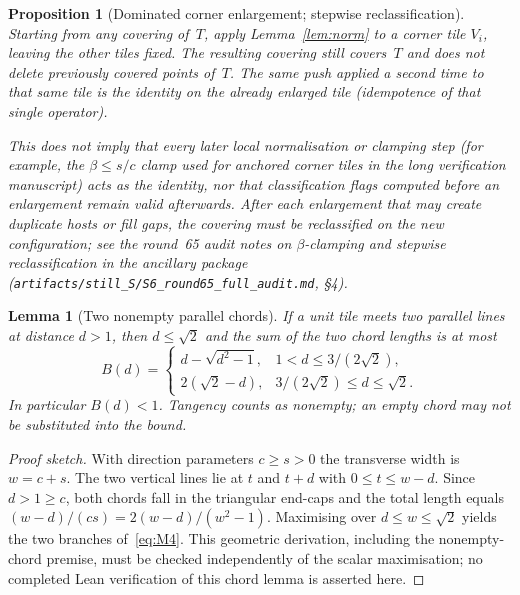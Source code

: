 \documentclass[11pt,reqno]{amsart}
\newtheorem{proposition}[theorem]{Proposition}
\newtheorem{lemma}[theorem]{Lemma}
\theoremstyle{definition}
\begin{document}


\begin{proposition}[Dominated corner enlargement; stepwise reclassification]\label{prop:M1}
Starting from any covering of~$T$, apply Lemma~\ref{lem:norm} to a corner tile
$V_i$, leaving the other tiles fixed.  The resulting covering still covers~$T$
and does not delete previously covered points of~$T$.  The same push applied a
second time to that same tile is the identity on the already enlarged tile
(idempotence of that single operator).

This does \emph{not} imply that every later local normalisation or clamping
step (for example, the $\beta\le s/c$ clamp used for anchored corner tiles in
the long verification manuscript) acts as the identity, nor that classification
flags computed before an enlargement remain valid afterwards.  After each
enlargement that may create duplicate hosts or fill gaps, the covering must be
\emph{reclassified} on the new configuration; see the round~65 audit notes on
$\beta$-clamping and stepwise reclassification in the ancillary package
(\texttt{artifacts/still\_S/S6\_round65\_full\_audit.md}, §4).
\end{proposition}

\begin{lemma}[Two nonempty parallel chords]\label{lem:B}
If a unit tile meets two parallel lines at distance $d>1$, then $d\le\sqrt2$
and the sum of the two chord lengths is at most
\begin{equation}\label{eq:M4}
B(d)=\begin{cases}
d-\sqrt{d^2-1},& 1<d\le 3/(2\sqrt2),\\
2(\sqrt2-d),& 3/(2\sqrt2)\le d\le\sqrt2.
\end{cases}
\end{equation}
In particular $B(d)<1$.  Tangency counts as nonempty; an empty chord may not
be substituted into the bound.
\end{lemma}

\begin{proof}[Proof sketch]
With direction parameters $c\ge s>0$ the transverse width is $w=c+s$.  The two
vertical lines lie at $t$ and $t+d$ with $0\le t\le w-d$.  Since $d>1\ge c$,
both chords fall in the triangular end-caps and the total length equals
$(w-d)/(cs)=2(w-d)/(w^2-1)$.  Maximising over $d\le w\le\sqrt2$ yields the
two branches of~\eqref{eq:M4}. This geometric derivation, including the
nonempty-chord premise, must be checked independently of the scalar maximisation;
no completed Lean verification of this chord lemma is asserted here.
\end{proof}
\end{document}
